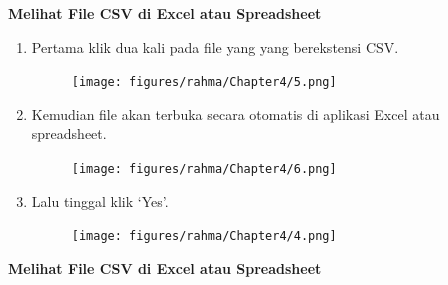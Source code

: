 \textbf{Melihat File CSV di Excel atau Spreadsheet}
\begin{enumerate}
	\item Pertama klik dua kali pada file yang yang berekstensi CSV.
		\begin{figure}[h]	\texttt{[image: figures/rahma/Chapter4/5.png]}
			\centering
		\end{figure}
		
	\item Kemudian file akan terbuka secara otomatis di aplikasi Excel atau spreadsheet.
		
		\begin{figure}[h] \texttt{[image: figures/rahma/Chapter4/6.png]}
			\centering
		\end{figure}
	\item Lalu tinggal klik `Yes'.	
		\begin{figure}[H] \texttt{[image: figures/rahma/Chapter4/4.png]}
			\centering
		\end{figure}
\end{enumerate}
\textbf{Melihat File CSV di Excel atau Spreadsheet}
